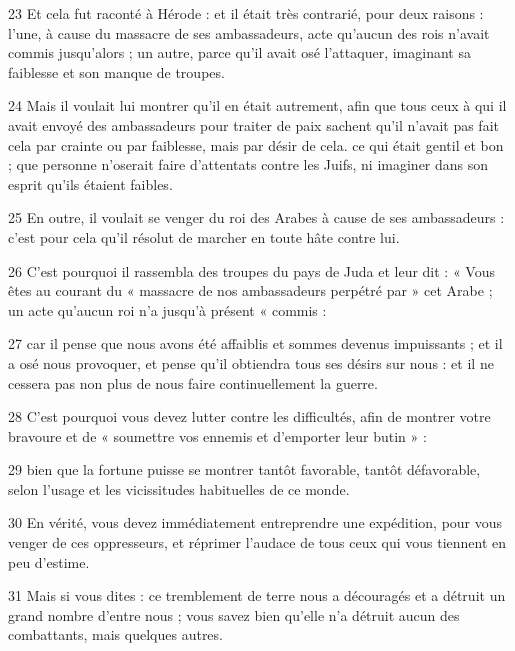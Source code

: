 \par 23 Et cela fut raconté à Hérode : et il était très contrarié, pour deux raisons : l'une, à cause du massacre de ses ambassadeurs, acte qu'aucun des rois n'avait commis jusqu'alors ; un autre, parce qu'il avait osé l'attaquer, imaginant sa faiblesse et son manque de troupes.

\par 24 Mais il voulait lui montrer qu'il en était autrement, afin que tous ceux à qui il avait envoyé des ambassadeurs pour traiter de paix sachent qu'il n'avait pas fait cela par crainte ou par faiblesse, mais par désir de cela. ce qui était gentil et bon ; que personne n'oserait faire d'attentats contre les Juifs, ni imaginer dans son esprit qu'ils étaient faibles.

\par 25 En outre, il voulait se venger du roi des Arabes à cause de ses ambassadeurs : c'est pour cela qu'il résolut de marcher en toute hâte contre lui.

\par 26 C'est pourquoi il rassembla des troupes du pays de Juda et leur dit : « Vous êtes au courant du « massacre de nos ambassadeurs perpétré par » cet Arabe ; un acte qu’aucun roi n’a jusqu’à présent « commis :

\par 27 car il pense que nous avons été affaiblis et sommes devenus impuissants ; et il a osé nous provoquer, et pense qu'il obtiendra tous ses désirs sur nous : et il ne cessera pas non plus de nous faire continuellement la guerre.

\par 28 C'est pourquoi vous devez lutter contre les difficultés, afin de montrer votre bravoure et de « soumettre vos ennemis et d'emporter leur butin » :

\par 29 bien que la fortune puisse se montrer tantôt favorable, tantôt défavorable, selon l'usage et les vicissitudes habituelles de ce monde.

\par 30 En vérité, vous devez immédiatement entreprendre une expédition, pour vous venger de ces oppresseurs, et réprimer l'audace de tous ceux qui vous tiennent en peu d'estime.

\par 31 Mais si vous dites : ce tremblement de terre nous a découragés et a détruit un grand nombre d'entre nous ; vous savez bien qu'elle n'a détruit aucun des combattants, mais quelques autres.

